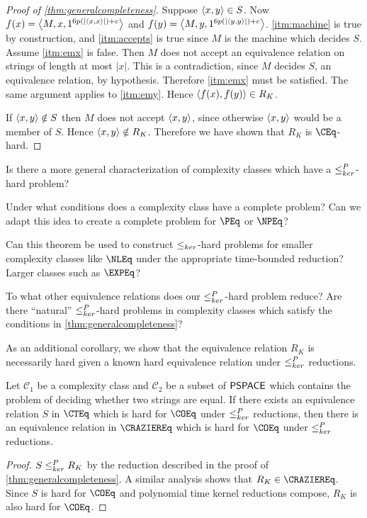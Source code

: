\begin{proof}[Proof of \autoref{thm:generalcompleteness}]
  Suppose $\left\langle x,y\right\rangle\in S$.
  Now $f(x)=\left\langle M,x,1^{6p(|\left\langle x,x\right\rangle|)+c}\right\rangle$ and $f(y)=\left\langle M,y,1^{6p(|\left\langle y,y\right\rangle|)+c}\right\rangle$.
  \autoref{itm:machine} is true by construction, and \autoref{itm:accepts} is true since $M$ is the machine which decides $S$.
  Assume \autoref{itm:emx} is false.
  Then $M$ does not accept an equivalence relation on strings of length at most $|x|$.
  This is a contradiction, since $M$ decides $S$, an equivalence relation, by hypothesis.
  Therefore \autoref{itm:emx} must be satisfied.
  The same argument applies to \autoref{itm:emy}.
  Hence $\left\langle f(x),f(y)\right\rangle\in R_K$.

  If $\left\langle x,y\right\rangle\notin S$ then $M$ does not accept $\left\langle x,y\right\rangle$, since otherwise $\left\langle x,y\right\rangle$ would be a member of $S$.
  Hence $\left\langle x,y\right\rangle\notin R_K$.
  Therefore we have shown that $R_K$ is $\CEq$-hard.
\end{proof}

\begin{openproblem}
  Is there a more general characterization of complexity classes which have a $\leq^{P}_{ker}$-hard problem?
\end{openproblem}

\begin{openproblem}
  Under what conditions does a complexity class have a complete problem?
  Can we adapt this idea to create a complete problem for $\PEq$ or $\NPEq$?
\end{openproblem}

\begin{openproblem}
  Can this theorem be used to construct $\leq_{ker}$-hard problems for smaller complexity classes like $\NLEq$ under the appropriate time-bounded reduction?
  Larger classes such as $\EXPEq$?
\end{openproblem}

\begin{openproblem}
  To what other equivalence relations does our $\leq^{P}_{ker}$-hard problem reduce?
  Are there ``natural'' $\leq^{P}_{ker}$-hard problems in complexity classes which satisfy the conditions in \autoref{thm:generalcompleteness}?
\end{openproblem}

As an additional corollary, we show that the equivalence relation $R_K$ is necessarily hard given a known hard equivalence relation under $\leq^{P}_{ker}$ reductions.

\begin{corollary}
  Let $\mathcal{C}_1$ be a complexity class and $\mathcal{C}_2$ be a subset of ${\mathsf{PSPACE}}$ which contains the problem of deciding whether two strings are equal.
  If there exists an equivalence relation $S$ in $\CTEq$ which is hard for $\COEq$ under $\leq^{P}_{ker}$ reductions, then there is an equivalence relation in $\CRAZIEREq$ which is hard for $\COEq$ under $\leq^{P}_{ker}$ reductions.
\end{corollary}
\begin{proof}
  $S\leq^{P}_{ker} R_K$ by the reduction described in the proof of \autoref{thm:generalcompleteness}.
  A similar analysis shows that $R_K\in\CRAZIEREq$.
  Since $S$ is hard for $\COEq$ and polynomial time kernel reductions compose, $R_K$ is also hard for $\COEq$.
\end{proof}

